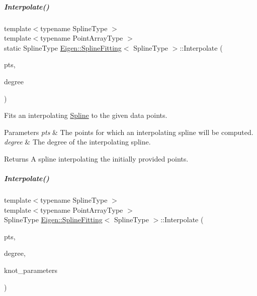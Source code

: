 \mbox{\label{group___splines___module_aa9bb76fd37d39abc7e465d034719ea0a}} 
\subparagraph{\texorpdfstring{Interpolate()}{Interpolate()}\hspace{0.1cm}{\footnotesize\ttfamily [2/4]}}
{\footnotesize\ttfamily template$<$typename Spline\+Type $>$ \\
template$<$typename Point\+Array\+Type $>$ \\
static Spline\+Type \hyperlink{group___splines___module_struct_eigen_1_1_spline_fitting}{Eigen\+::\+Spline\+Fitting}$<$ Spline\+Type $>$\+::Interpolate (\begin{DoxyParamCaption}\item[{const Point\+Array\+Type \&}]{pts,  }\item[{Dense\+Index}]{degree }\end{DoxyParamCaption})\hspace{0.3cm}{\ttfamily [static]}}



Fits an interpolating \hyperlink{group___splines___module_class_eigen_1_1_spline}{Spline} to the given data points. 


\begin{DoxyParams}{Parameters}
{\em pts} & The points for which an interpolating spline will be computed. \\
\hline
{\em degree} & The degree of the interpolating spline.\\
\hline
\end{DoxyParams}
\begin{DoxyReturn}{Returns}
A spline interpolating the initially provided points. 
\end{DoxyReturn}
\mbox{\label{group___splines___module_af08185c8b635283f7c76efe91576cc83}} 
\subparagraph{\texorpdfstring{Interpolate()}{Interpolate()}\hspace{0.1cm}{\footnotesize\ttfamily [3/4]}}
{\footnotesize\ttfamily template$<$typename Spline\+Type $>$ \\
template$<$typename Point\+Array\+Type $>$ \\
Spline\+Type \hyperlink{group___splines___module_struct_eigen_1_1_spline_fitting}{Eigen\+::\+Spline\+Fitting}$<$ Spline\+Type $>$\+::Interpolate (\begin{DoxyParamCaption}\item[{const Point\+Array\+Type \&}]{pts,  }\item[{Dense\+Index}]{degree,  }\item[{const Knot\+Vector\+Type \&}]{knot\+\_\+parameters }\end{DoxyParamCaption})\hspace{0.3cm}{\ttfamily [static]}}



